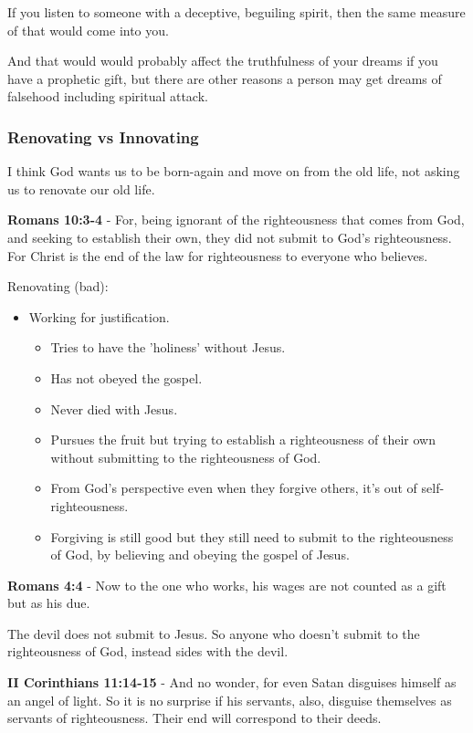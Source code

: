\documentclass[11pt]{article}
\begin{document}
If you listen to someone with a deceptive, beguiling spirit, then the same measure of that would come into you.

And that would would probably affect the truthfulness of your dreams if you have a prophetic gift, but there are other reasons a person may get dreams of falsehood including spiritual attack.

\subsubsection{Renovating vs Innovating}
\label{sec:orgb75f753}
I think God wants us to be born-again and move on from the old life,
not asking us to renovate our old life.

\textbf{Romans 10:3-4} - For, being ignorant of the righteousness that comes from God, and seeking to establish their own, they did not submit to God's righteousness. For Christ is the end of the law for righteousness to everyone who believes.

Renovating (bad):
\begin{itemize}
\item Working for justification.
\begin{itemize}
\item Tries to have the 'holiness' without Jesus.
\item Has not obeyed the gospel.
\item Never died with Jesus.
\item Pursues the fruit but trying to establish a righteousness of their own without submitting to the righteousness of God.
\item From God's perspective even when they forgive others, it's out of self-righteousness.
\item Forgiving is still good but they still need to submit to the righteousness of God, by believing and obeying the gospel of Jesus.
\end{itemize}
\end{itemize}

\textbf{Romans 4:4} - Now to the one who works, his wages are not counted as a gift but as his due.

The devil does not submit to Jesus. So anyone who doesn't submit to the righteousness of God, instead sides with the devil.

\textbf{II Corinthians 11:14-15} - And no wonder, for even Satan disguises himself as an angel of light. So it is no surprise if his servants, also, disguise themselves as servants of righteousness. Their end will correspond to their deeds.
\end{document}
